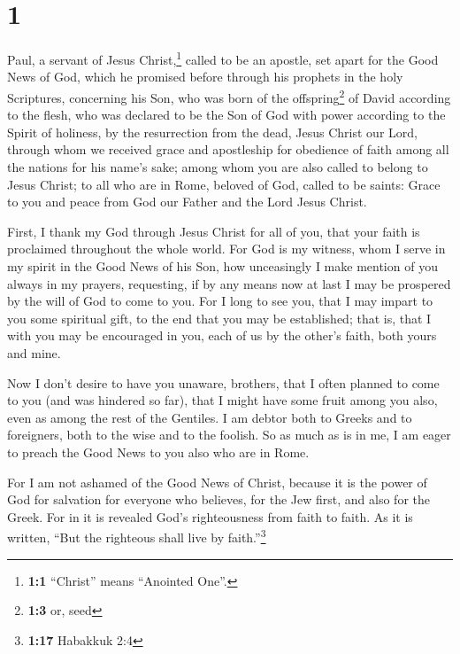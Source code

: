 \hypertarget{section}{%
\section{1}\label{section}}

 Paul, a servant of Jesus Christ,\footnote{\textbf{1:1}
  ``Christ'' means ``Anointed One''.} called to be an apostle, set apart
for the Good News of God,  which he promised before
through his prophets in the holy Scriptures,  concerning
his Son, who was born of the offspring\footnote{\textbf{1:3} or, seed}
of David according to the flesh,  who was declared to be
the Son of God with power according to the Spirit of holiness, by the
resurrection from the dead, Jesus Christ our Lord, 
through whom we received grace and apostleship for obedience of faith
among all the nations for his name's sake;  among whom you
are also called to belong to Jesus Christ;  to all who are
in Rome, beloved of God, called to be saints: Grace to you and peace
from God our Father and the Lord Jesus Christ.

 First, I thank my God through Jesus Christ for all of
you, that your faith is proclaimed throughout the whole world.
 For God is my witness, whom I serve in my spirit in the
Good News of his Son, how unceasingly I make mention of you always in my
prayers,  requesting, if by any means now at last I may
be prospered by the will of God to come to you.  For I
long to see you, that I may impart to you some spiritual gift, to the
end that you may be established;  that is, that I with
you may be encouraged in you, each of us by the other's faith, both
yours and mine.

 Now I don't desire to have you unaware, brothers, that I
often planned to come to you (and was hindered so far), that I might
have some fruit among you also, even as among the rest of the Gentiles.
 I am debtor both to Greeks and to foreigners, both to
the wise and to the foolish.  So as much as is in me, I
am eager to preach the Good News to you also who are in Rome.

 For I am not ashamed of the Good News of Christ, because
it is the power of God for salvation for everyone who believes, for the
Jew first, and also for the Greek.  For in it is revealed
God's righteousness from faith to faith. As it is written, ``But the
righteous shall live by faith.''\footnote{\textbf{1:17} Habakkuk 2:4}

